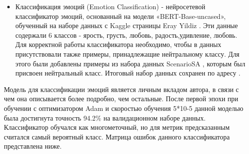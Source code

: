 \begin{itemize}
\item Классификация эмоций (Emotion Classification) -  нейросетевой классификатор эмоций, основанный на модели «BERT-Base-uncased», обученный на наборе данных с Kaggle страницы Eray Yildiz \cite{na_website_ndp_emo}. Эти данные содержали 6 классов - ярость, грусть, любовь, радость,удивление, любовь. Для корректной работы классификатора необходимо, чтобы в данных присутствовали также примеры, принадлежащие нейтральному классу. Для этого были добавлены примеры из набора данных ScenarioSA \cite{scenariosa}, которым был присвоен нейтральный класс. Итоговый набор данных сохранен по адресу \cite{na_website_ndo_emo}.
\end{itemize}
Модель для классификации эмоций является личным вкладом автора, в связи с чем она описывается более подробно, чем остальные. После первой эпохи при обучении с оптимизатором Adam и скоростью обучения 5*10-5 данной моделью была достигнута точность 94.2\% на валидационном наборе данных. Классификатор обучался как многометочный, но для метрик предсказанным считался самый вероятный класс. Матрица ошибок данного классификатора представлена ниже.


\begin{table}[htbp]
\centering
\caption {Матрица ошибок классификатора эмоций из Alexa Prize Challenge 3}
\label{tab:dream1}%
\end{table}



